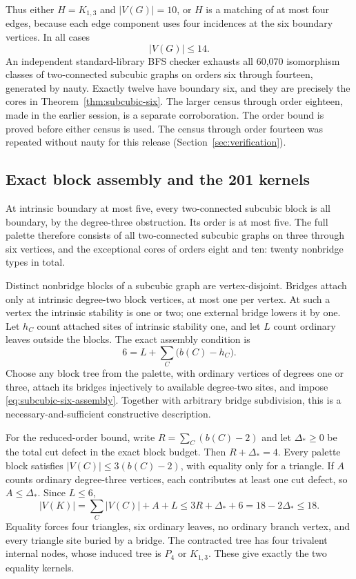 Thus either $H=K_{1,3}$ and $|V(G)|=10$, or $H$ is a matching of at most
four edges, because each edge component uses four incidences at the six
boundary vertices. In all cases
\[
 \boxed{|V(G)|\le14.}
\]
An independent standard-library BFS checker exhausts all 60,070
isomorphism classes of two-connected subcubic graphs on orders six through
fourteen, generated by nauty. Exactly twelve have boundary six, and they
are precisely the cores in Theorem~\ref{thm:subcubic-six}. The larger census
through order eighteen, made in the earlier session, is a separate
corroboration. The order bound is proved before either census is used.
The census through order fourteen was repeated without nauty for this
release (Section~\ref{sec:verification}).

\subsection{Exact block assembly and the 201 kernels}
At intrinsic boundary at most five, every two-connected subcubic block is
all boundary, by the degree-three obstruction. Its order is at most five.
The full palette therefore consists of all two-connected subcubic graphs
on three through six vertices, and the exceptional cores of orders eight
and ten: twenty nonbridge types in total.

Distinct nonbridge blocks of a subcubic graph are vertex-disjoint. Bridges
attach only at intrinsic degree-two block vertices, at most one per vertex.
At such a vertex the intrinsic stability is one or two; one external bridge
lowers it by one. Let $h_C$ count attached sites of intrinsic stability one,
and let $L$ count ordinary leaves outside the blocks. The exact assembly
condition is
\begin{equation}\label{eq:subcubic-six-assembly}
 6=L+\sum_C\bigl(b(C)-h_C\bigr).
\end{equation}
Choose any block tree from the palette, with ordinary vertices of degrees
one or three, attach its bridges injectively to available degree-two sites,
and impose \eqref{eq:subcubic-six-assembly}. Together with arbitrary bridge
subdivision, this is a necessary-and-sufficient constructive description.

For the reduced-order bound, write $R=\sum_C(b(C)-2)$ and let $\Delta_*\ge0$
be the total cut defect in the exact block budget. Then $R+\Delta_*=4$.
Every palette block satisfies $|V(C)|\le3(b(C)-2)$, with equality only for
a triangle. If $A$ counts ordinary degree-three vertices, each contributes
at least one cut defect, so $A\le\Delta_*$. Since $L\le6$,
\[
 |V(K)|=\sum_C|V(C)|+A+L
 \le3R+\Delta_*+6=18-2\Delta_*\le18.
\]
Equality forces four triangles, six ordinary leaves, no ordinary branch
vertex, and every triangle site buried by a bridge. The contracted tree
has four trivalent internal nodes, whose induced tree is $P_4$ or
$K_{1,3}$. These give exactly the two equality kernels.

